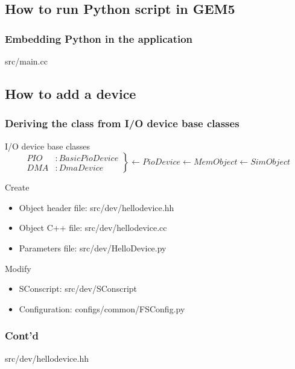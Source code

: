 \documentclass{beamer}
\begin{document}
\subsection{How to run Python script in GEM5}
\begin{frame}
\frametitle{Embedding Python in the application}
\begin{block}{src/main.cc}
    
\end{block}
\end{frame}
\begin{frame}
\section{How to add a device}
\frametitle{Deriving the class from I/O device base classes}
\begin{block}{I/O device base classes}
    \begin{equation*}
	\left.
	\begin{aligned}
	    PIO &: BasicPioDevice\\ 
	    DMA &: DmaDevice 
	\end{aligned}
	\right\}
	\leftarrow PioDevice  \leftarrow MemObject  \leftarrow SimObject
    \end{equation*}
\end{block}
\begin{block}{Create\cite{asplos}}
    \begin{itemize} 
	\item Object header file: src/dev/hellodevice.hh
	\item Object C++ file: src/dev/hellodevice.cc
	\item Parameters file: src/dev/HelloDevice.py
    \end{itemize}
\end{block}
\begin{block}{Modify\cite{asplos}}
    \begin{itemize} 
	\item SConscript: src/dev/SConscript 
	\item Configuration: configs/common/FSConfig.py
    \end{itemize}
\end{block}
\end{frame}
\begin{frame}
    \frametitle{Cont'd}
    \begin{block}{src/dev/hellodevice.hh}
	
    \end{block}
\end{frame}
\end{document}
